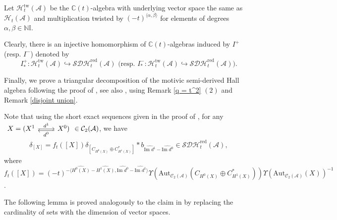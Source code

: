 \documentclass[12pt]{amsart}
\theoremstyle{definition}
\numberwithin{equation}{section}
\begin{document}
Let $ \mathcal{H}_t^{\mathrm{tw}}(\mathcal{A}) $ be the $ \mathbb{C}(t) $-algebra with underlying vector space the same as $ \mathcal{H}_t(\mathcal{A}) $ and multiplication twisted by $ (-t)^{\langle \alpha,\beta \rangle} $ for elements of degrees $ \alpha,\beta \in \mathbb{N}\mathbb{I} $. 

Clearly, there is an injective homomorphism of $ \mathbb{C}(t) $-algebras induced by $ I^+ $ (resp. $ I^- $) denoted by
\[ I^+_*: \mathcal{H}_t^{\mathrm{tw}}(\mathcal{A}) \hookrightarrow \mathcal{SDH}^{\mathrm{red}}_t(\mathcal{A}) \text{  (resp. } I^-_*:\mathcal{H}_t^{\mathrm{tw}}(\mathcal{A}) \hookrightarrow \mathcal{SDH}^{\mathrm{red}}_t(\mathcal{A}) ).\]

Finally, we prove a triangular decomposition of the motivic semi-derived Hall algebra following the proof of \cite[Theorem 3.25]{LP21}, see also \cite[Lemma 4.7]{Bridgeland13}, using Remark \ref{q = t^2} $ (2) $ and Remark \ref{disjoint union}. 

Note that using the short exact sequences given in the proof of \cite[Proposition 3.12]{LP21}, for any $\begin{tikzcd} X = (X^1 \arrow[r,"d^1"] & X^0) \arrow[l, shift left,"d^0"] \end{tikzcd} \in \mathcal{C}_2(\mathcal{A}) $, we have
    \begin{align*}
        \delta_{[X]} = f_t([X]) \delta_{[C_{H^0(X)} \oplus C_{H^1(X)}^*]} * b_{\widehat{\mathrm{Im}\;d^1}-\widehat{\mathrm{Im}\;d^0}} \in\mathcal{SDH}^{\mathrm{red}}_t(\mathcal{A}) , 
    \end{align*}
where $ f_t([X]) = (-t)^{-\langle \widehat{H^0(X)}- \widehat{H^1(X)},\widehat{\mathrm{Im}\;d^0} - \widehat{\mathrm{Im}\;d^1}\rangle} \Upsilon(\mathrm{Aut}_{\mathcal{C}_2(\mathcal{A})}(C_{H^0(X)} \oplus C_{H^1(X)}^*))\Upsilon(\mathrm{Aut}_{\mathcal{C}_2(\mathcal{A})}(X))^{-1} $.  

The following lemma is proved analogously to the claim in \cite[Theorem 3.25]{LP21} by replacing the cardinality of sets with the dimension of vector spaces. 
\end{document}
